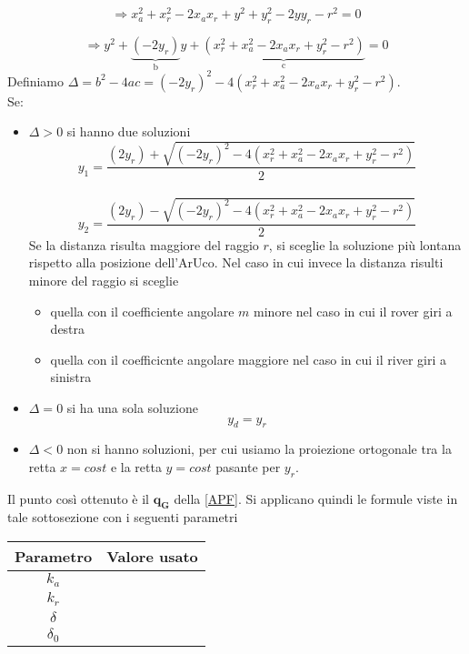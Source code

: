 \begin{equation}
\Rightarrow x_a^2+x_r^2-2x_ax_r+y^2+y_r^2-2yy_r-r^2=0
\end{equation}

\begin{equation*}
\Rightarrow y^2+\underbrace{(-2y_r)}_\text{b}y+\underbrace{(x_r^2+x_a^2-2x_ax_r+y_r^2-r^2)}_\text{c}=0
\end{equation*}
Definiamo $\Delta=b^2-4ac=(-2y_r)^2-4(x_r^2+x_a^2-2x_ax_r+y_r^2-r^2)$. \\Se:
\begin{itemize}
    \item $\Delta>0$ si hanno due soluzioni
        \begin{equation}
        y_1=\frac{(2y_r)+\sqrt{(-2y_r)^2-4(x_r^2+x_a^2-2x_ax_r+y_r^2-r^2)}}{2}
        \end{equation}
        \\
        \begin{equation}
        y_2=\frac{(2y_r)-\sqrt{(-2y_r)^2-4(x_r^2+x_a^2-2x_ax_r+y_r^2-r^2)}}{2}
        \end{equation}
  Se la distanza risulta maggiore del raggio $r$, si sceglie la soluzione più lontana rispetto alla posizione dell'ArUco.
        Nel caso in cui invece la distanza risulti minore del raggio si sceglie 
        \begin{itemize}
            \item quella con il coefficiente angolare $m$ minore nel caso in cui il rover giri a destra
            \item quella con il coefficicnte angolare maggiore nel caso in cui il river giri a sinistra
        \end{itemize}    \item $\Delta=0$ si ha una sola soluzione
    \begin{equation}
        y_d=y_r
        \end{equation}
    \item $\Delta<0$ non si hanno soluzioni, per cui usiamo la proiezione ortogonale tra la retta $x=cost$ e la retta $y=cost$ pasante per $y_r$.
\end{itemize}
Il punto così ottenuto è il $\boldsymbol{q_G}$ della \autoref{APF}.
Si applicano quindi le formule viste in tale sottosezione con i seguenti parametri

\begin{table} [H]
    \centering
    \begin{tabular}{|cc|}
    \hline
        Parametro & Valore usato \\  \hline
        $k_a$ &      \\  \hline
        $k_r$ &    \\  \hline
        $\delta$ &    \\  \hline
        $\delta_0$ &    \\  \hline
    \end{tabular}
\end{table}
